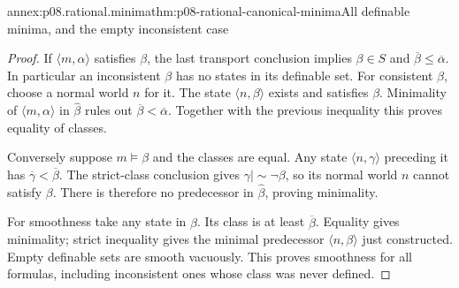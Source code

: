 \begin{annexitem}{annex:p08.rational.minima}{thm:p08-rational-canonical-minima}{All definable minima, and the empty inconsistent case}
\begin{proof}
If \(\langle m,\alpha\rangle\) satisfies \(\beta\), the
last transport conclusion implies \(\beta\in S\) and
\(\overline\beta\leq\overline\alpha\). In particular an
inconsistent \(\beta\) has no states in its definable set.
For consistent \(\beta\), choose a normal world \(n\) for it.
The state \(\langle n,\beta\rangle\) exists and satisfies
\(\beta\). Minimality of \(\langle m,\alpha\rangle\)
in \(\widehat\beta\) rules out
\(\overline\beta<\overline\alpha\). Together with the previous
inequality this proves equality of classes.

Conversely suppose \(m\models\beta\) and the classes are equal.
Any state \(\langle n,\gamma\rangle\) preceding it has
\(\overline\gamma<\overline\beta\). The strict-class conclusion
gives \(\gamma\mathrel{|\!\sim}\neg\beta\), so its normal
world \(n\) cannot satisfy \(\beta\). There is therefore no
predecessor in \(\widehat\beta\), proving minimality.

For smoothness take any state in \(\widehat\beta\). Its class
is at least \(\overline\beta\). Equality gives minimality;
strict inequality gives the minimal predecessor
\(\langle n,\beta\rangle\) just constructed. Empty definable
sets are smooth vacuously. This proves smoothness for all formulas,
including inconsistent ones whose class was never defined.
\end{proof}
\end{annexitem}

